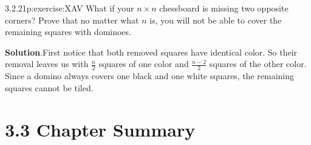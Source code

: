 \documentclass[twoside,11pt,]{book}
\newcommand{\blocktitlefont}{\relax}
\numberwithin{equation}{chapter}
\begin{document}
\begin{divisionsolution}{3.2.21}{}{p:exercise:XAV}%
What if your \(n\times n\) chessboard is missing two opposite corners? Prove that no matter what \(n\) is, you will not be able to cover the remaining squares with dominoes.%
\begin{sidebyside}{1}{0.4}{0.4}{0}%
\begin{sbspanel}{0.2}%
%
\end{sbspanel}%
\end{sidebyside}%
\par\smallskip%
\noindent\textbf{\blocktitlefont Solution}.\quad{}First notice that both removed squares have identical color. So their removal leaves us with \(\frac{n}{2}\) squares of one color and \(\frac{n-2}{2}\) squares of the other color. Since a domino always covers one black and one white squares, the remaining squares cannot be tiled.%
\end{divisionsolution}%
\section*{3.3 Chapter Summary}
\end{document}
